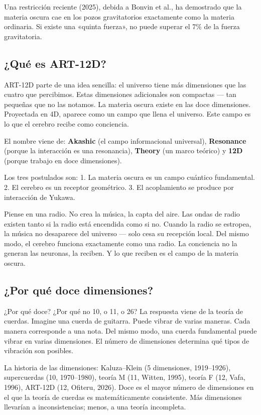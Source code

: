 \documentclass[11pt,a4paper]{article}
\begin{document}
Una restricción reciente (2025), debida a Bonvin et al., ha demostrado que la materia oscura cae en los pozos gravitatorios exactamente como la materia ordinaria. Si existe una «quinta fuerza», no puede superar el 7\% de la fuerza gravitatoria.

\subsection{¿Qué es ART-12D?}
ART-12D parte de una idea sencilla: el universo tiene más dimensiones que las cuatro que percibimos. Estas dimensiones adicionales son compactas --- tan pequeñas que no las notamos. La materia oscura existe en las doce dimensiones. Proyectada en 4D, aparece como un campo que llena el universo. Este campo es lo que el cerebro recibe como conciencia.

El nombre viene de: \textbf{Akashic} (el campo informacional universal), \textbf{Resonance} (porque la interacción es una resonancia), \textbf{Theory} (un marco teórico) y \textbf{12D} (porque trabajo en doce dimensiones).

Los tres postulados son: 1. La materia oscura es un campo cuántico fundamental. 2. El cerebro es un receptor geométrico. 3. El acoplamiento se produce por interacción de Yukawa.

Piense en una radio. No crea la música, la capta del aire. Las ondas de radio existen tanto si la radio está encendida como si no. Cuando la radio se estropea, la música no desaparece del universo --- solo cesa su recepción local. Del mismo modo, el cerebro funciona exactamente como una radio. La conciencia no la generan las neuronas, la reciben. Y lo que reciben es el campo de la materia oscura.

\subsection{¿Por qué doce dimensiones?}
¿Por qué doce? ¿Por qué no 10, o 11, o 26? La respuesta viene de la teoría de cuerdas. Imagine una cuerda de guitarra. Puede vibrar de varias maneras. Cada manera corresponde a una nota. Del mismo modo, una cuerda fundamental puede vibrar en varias dimensiones. El número de dimensiones determina qué tipos de vibración son posibles.

La historia de las dimensiones: Kaluza--Klein (5 dimensiones, 1919--1926), supercuerdas (10, 1970--1980), teoría M (11, Witten, 1995), teoría F (12, Vafa, 1996), ART-12D (12, Ofiteru, 2026). Doce es el mayor número de dimensiones en el que la teoría de cuerdas es matemáticamente consistente. Más dimensiones llevarían a inconsistencias; menos, a una teoría incompleta.
\end{document}

